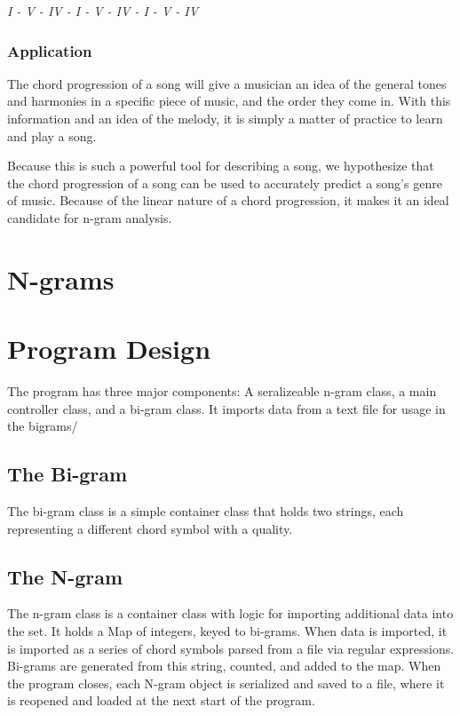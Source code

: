 \documentclass{article}
\begin{document}
		\begin{center}
		\emph{I - V - IV - I - V - IV - I - V - IV}
		\end{center}

		\subsubsection{Application}
		The chord progression of a song will give a musician an idea of the general 
		tones and harmonies in a specific piece of music, and the order they 
		come in.  With this information and an idea of the melody, it is simply 
		a matter of practice to learn and play a song.

		Because this is such a powerful tool for describing a song, we hypothesize 
		that the chord progression of a song can be used to accurately predict a 
		song's genre of music.  Because of the linear nature of a chord progression, 
		it makes it an ideal candidate for n-gram analysis.
  
\newpage

\section{N-grams}

\newpage

\section{Program Design}
The program has three major components:  A seralizeable n-gram class,
a main controller class, and a bi-gram class.  It imports data from a text 
file for usage in the bigrams/

	\subsection{The Bi-gram}
	The bi-gram class is a simple container class that holds two strings, each 
	representing a different chord symbol with a quality.


		\subsection{The N-gram}
		The n-gram class is a container class with logic for importing additional 
		data into the set.  It holds a Map of integers, keyed to bi-grams.  When 
		data is imported, it is imported as a series of chord symbols parsed 
		from a file via regular expressions.  Bi-grams are generated from this 
		string, counted, and added to the map.  When the program closes, each 
		N-gram object is serialized and saved to a file, where it is reopened and 
		loaded at the next start of the program.
\end{document}
